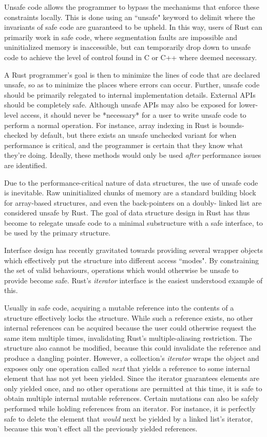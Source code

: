 \documentclass{cccg13}
\begin{document}
Unsafe code allows the programmer to bypass the mechanisms that enforce these
constraints locally. This is done using an ``unsafe" keyword to delimit
where the invariants of safe code are guaranteed to be upheld. In this way,
users of Rust can primarily work in safe code, where segmentation faults are
impossible and uninitialized memory is inaccessible, but can temporarily drop
down to unsafe code to achieve the level of control found in C or C++ where
deemed necessary.

A Rust programmer's goal is then to minimize the lines of code that are
declared unsafe, so as to minimize the places where errors can occur. Further,
unsafe code should be primarily relegated to internal implementation details.
External APIs should be completely safe. Although unsafe APIs may also be
exposed for lower-level access, it should never be *necessary* for a user to
write unsafe code to perform a normal operation. For instance, array indexing
in Rust is bounds-checked by default, but there exists an unsafe unchecked
variant for when performance is critical, and the programmer is certain that
they know what they're doing. Ideally, these methods would only be used
\emph{after} performance issues are identified.

Due to the performance-critical nature of data structures, the use of unsafe
code is inevitable. Raw uninitialized chunks of memory are a standard building
block for array-based structures, and even the back-pointers on a doubly-
linked list are considered unsafe by Rust. The goal of data structure design
in Rust has thus become to relegate unsafe code to a minimal substructure with
a safe interface, to be used by the primary structure.

Interface design has recently gravitated towards providing several wrapper
objects which effectively put the structure into different access ``modes". By
constraining the set of valid behaviours, operations which would otherwise be
unsafe to provide become safe. Rust's \emph{iterator} interface is the easiest
understood example of this.

Usually in safe code, acquiring a mutable reference into the contents of a
structure effectively locks the structure. While such a reference exists, no
other internal references can be acquired because the user could otherwise
request the same item multiple times, invalidating Rust's multiple-aliasing
restriction. The structure also cannot be modified, because this could
invalidate the reference and produce a dangling pointer. However, a
collection's \emph{iterator} wraps the object and exposes only one operation
called \emph{next} that yields a reference to some internal element that has
not yet been yielded. Since the iterator guarantees elements are only yielded
once, and no other operations are permitted at this time, it is safe to obtain
multiple internal mutable references. Certain mutations can also be safely
performed while holding references from an iterator. For instance, it is
perfectly safe to delete the element that \emph{would} next be yielded by a
linked list's iterator, because this won't effect all the previously yielded
references.
\end{document}
